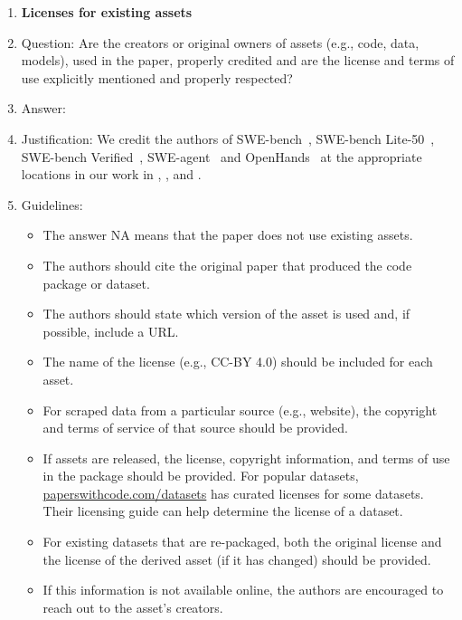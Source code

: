 \documentclass{article}
\begin{document}
\begin{enumerate}
\item {\bf Licenses for existing assets}
    \item[] Question: Are the creators or original owners of assets (e.g., code, data, models), used in the paper, properly credited and are the license and terms of use explicitly mentioned and properly respected?
    \item[] Answer: \answerYes{} %
    \item[] Justification: We credit the authors of SWE-bench~\cite{jimenez2024swebench}, SWE-bench Lite-50~\cite{badertdinov2024scaling}, SWE-bench Verified~\cite{openai_swe_bench_verified_2024}, SWE-agent~\cite{yang_swe-agent_2024} and OpenHands~\cite{wang2025openhands} at the appropriate locations in our work in , , and .
    \item[] Guidelines:
    \begin{itemize}
        \item The answer NA means that the paper does not use existing assets.
        \item The authors should cite the original paper that produced the code package or dataset.
        \item The authors should state which version of the asset is used and, if possible, include a URL.
        \item The name of the license (e.g., CC-BY 4.0) should be included for each asset.
        \item For scraped data from a particular source (e.g., website), the copyright and terms of service of that source should be provided.
        \item If assets are released, the license, copyright information, and terms of use in the package should be provided. For popular datasets, \url{paperswithcode.com/datasets} has curated licenses for some datasets. Their licensing guide can help determine the license of a dataset.
        \item For existing datasets that are re-packaged, both the original license and the license of the derived asset (if it has changed) should be provided.
        \item If this information is not available online, the authors are encouraged to reach out to the asset's creators.
    \end{itemize}


\end{enumerate}
\end{document}
